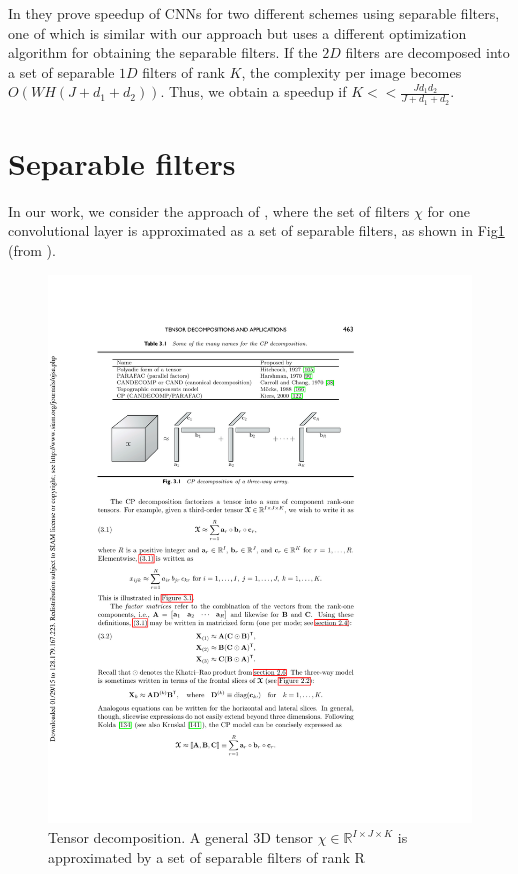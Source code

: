 \documentclass{article} %
\begin{document}
In \citep{Jaderberg14b} they prove speedup of CNNs for two different schemes using separable filters, one of which is similar with our approach but uses a different optimization algorithm for obtaining the separable filters. 
  If the $2D$ filters are decomposed into a set of separable $1D$ filters of rank $K$, the complexity per image becomes
 $O(WH(J +d_{1}+d_{2}))$. Thus, we obtain a speedup if $K<< \frac{Jd_{1}d_{2}}{J +d_{1}+d_{2}}$. 

\section{Separable filters}
In our work, we consider the approach of \citep{DBLP:dblp_journals/pami/SironiTRLF15}, where the set of filters $\chi$ for one convolutional layer is approximated as
a set of separable filters, as shown in Fig\ref{fig:decomposition} (from \citep{KoBa09}).
\begin{figure}[h]
  \centering
   \includegraphics[width=\textwidth]{images/decomposable.pdf}
  \caption{Tensor decomposition. A general 3D tensor  $\chi \in \mathbb{R}^{I\times J\times K}$ is approximated by a set of separable filters of rank  R}
  \label{fig:decomposition}
\end{figure}
\end{document}
